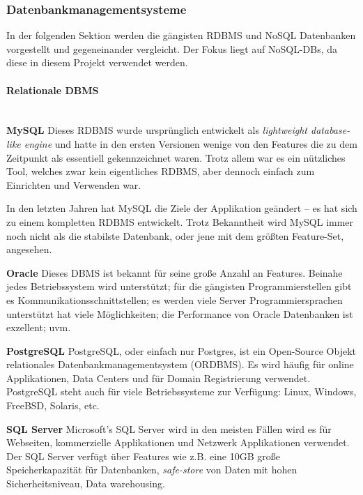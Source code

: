 \subsubsection{Datenbankmanagementsysteme}
\label{subsec:dbms}

In der folgenden Sektion werden die gängisten RDBMS und NoSQL Datenbanken vorgestellt und gegeneinander vergleicht. Der Fokus liegt auf NoSQL-DBs, da diese in diesem Projekt verwendet werden.

\paragraph{Relationale DBMS}\mbox{}\\
\textbf{MySQL\newline}
Dieses RDBMS wurde ursprünglich entwickelt als \textit{lightweight database-like engine} und hatte in den ersten Versionen wenige von den Features die zu dem Zeitpunkt als essentiell gekennzeichnet waren. Trotz allem war es ein nützliches Tool, welches zwar kein eigentliches RDBMS, aber dennoch einfach zum Einrichten und Verwenden war.

In den letzten Jahren hat MySQL die Ziele der Applikation geändert – es hat sich zu einem kompletten RDBMS entwickelt.  Trotz Bekanntheit wird MySQL immer noch nicht als die stabilste Datenbank, oder jene mit dem größten Feature-Set, angesehen.

\textbf{Oracle\newline}
Dieses DBMS ist bekannt für seine große Anzahl an Features. Beinahe jedes Betriebssystem wird unterstützt; für die gängisten Programmierstellen gibt es Kommunikationsschnittstellen; es werden viele Server Programmiersprachen unterstützt hat viele Möglichkeiten; die Performance von Oracle Datenbanken ist exzellent; uvm.

\textbf{PostgreSQL\newline}
PostgreSQL, oder einfach nur Postgres, ist ein Open-Source Objekt relationales Datenbankmanagementsystem (ORDBMS). Es wird häufig für online Applikationen, Data Centers und für Domain Registrierung verwendet. PostgreSQL steht auch für viele Betriebssysteme zur Verfügung: Linux, Windows, FreeBSD, Solaris, etc.

\textbf{SQL Server\newline}
Microsoft's SQL Server wird in den meisten Fällen wird es für Webseiten, kommerzielle Applikationen und Netzwerk Applikationen verwendet. Der SQL Server verfügt über Features wie z.B. eine 10GB große Speicherkapazität für Datenbanken, \textit{safe-store} von Daten mit hohen Sicherheitsniveau, Data warehousing.\nextline 

